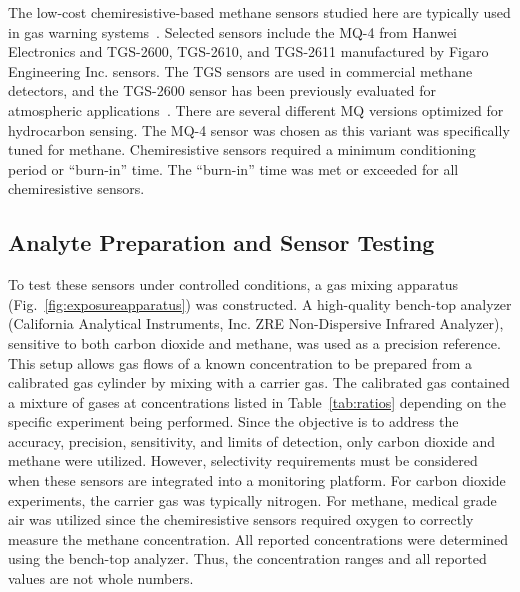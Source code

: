 \documentclass[sensors,article,submit,moreauthors,pdftex]{Definitions/mdpi}
\begin{document}
			The low-cost chemiresistive-based methane sensors studied here are typically used in gas warning systems~\cite{chiu_towards_2013}.
			Selected sensors include the MQ-4 from Hanwei Electronics and TGS-2600, TGS-2610, and TGS-2611 manufactured by Figaro Engineering Inc. sensors.
			The TGS sensors are used in commercial methane detectors, and the TGS-2600 sensor has been previously evaluated for atmospheric applications~\cite{eugster_performance_2012,bossche_potential_2017}.
			There are several different MQ versions optimized for hydrocarbon sensing.
			The MQ-4 sensor was chosen as this variant was specifically tuned for methane.
			Chemiresistive sensors required a minimum conditioning period or ``burn-in'' time.
			The ``burn-in'' time was met or exceeded for all chemiresistive sensors.
			
		\subsection{Analyte Preparation and Sensor Testing}
			
			To test these sensors under controlled conditions, a gas mixing apparatus (Fig.~\ref{fig:exposureapparatus}) was constructed.
			A high-quality bench-top analyzer (California Analytical Instruments, Inc. ZRE Non-Dispersive Infrared Analyzer), sensitive to both carbon dioxide and methane, was used as a precision reference. This setup allows gas flows of a known concentration to be prepared from a calibrated gas cylinder by mixing with a carrier gas.
			The calibrated gas contained a mixture of gases at concentrations listed in Table~\ref{tab:ratios} depending on the specific experiment being performed.
			Since the objective is to address the accuracy, precision, sensitivity, and limits of detection, only carbon dioxide and methane were utilized.
			However, selectivity requirements must be considered when these sensors are integrated into a monitoring platform.
			For carbon dioxide experiments, the carrier gas was typically nitrogen.
			For methane, medical grade air was utilized since the chemiresistive sensors required oxygen to correctly measure the methane concentration.
			All reported concentrations were determined using the bench-top analyzer.
			Thus, the concentration ranges and all reported values are not whole numbers.
			
\end{document}

